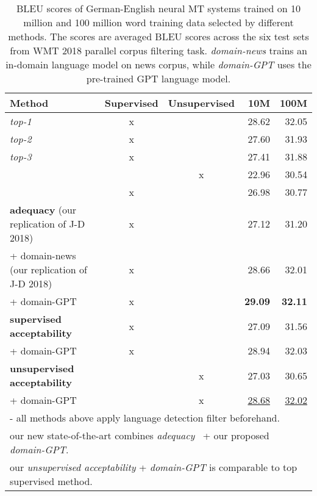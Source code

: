 \documentclass[11pt,a4paper]{article}
\begin{document}
\begin{table*}  \centering
    \begin{tabular}{lccrr}
        \textbf{Method} & \textbf{Supervised} & \textbf{Unsupervised} & \textbf{10M} & \textbf{100M} \\ \hline
        \citet{junczys2018dual} {\small \textit{top-1}} & x & & 28.62 & 32.05 \\
        \citet{lu2018alibaba} {\small \textit{top-2}} & x & & 27.60 & 31.93 \\
        \citet{lo2018accurate} {\small \textit{top-3}} & x & & 27.41 & 31.88 \\
\citet{hangya2018unsupervised} &  & x & 22.96 & 30.54 \\ 
        \citet{chaudhary2019low} & x & & 26.98 & 30.77 \\ \hline
        \textbf{adequacy} (our replication of J-D 2018)& x &   & 27.12 & 31.20 \\
        \hspace{2mm} + domain-news (our replication of J-D 2018) & x &   & 28.66 & 32.01 \\
        \hspace{2mm} + domain-GPT & x &   & \textbf{29.09} & \textbf{32.11} \\ \hline
        \textbf{supervised acceptability} & x &   & 27.09 & 31.56 \\
        \hspace{2mm} + domain-GPT & x &   & 28.94 & 32.03 \\ \hline
        \textbf{unsupervised acceptability} &  & x & 27.03 & 30.65 \\
        \hspace{2mm} + domain-GPT &  & x  & \underline{28.68} &  \underline{32.02} \\ \hline
\multicolumn{5}{p{0.9\textwidth}}{\small - all methods above apply language detection filter beforehand.}\\
        \multicolumn{5}{p{0.9\textwidth}}{\small  our new state-of-the-art combines \textit{adequacy}~\cite{junczys2018dual} + our proposed \textit{domain-GPT}.}\\
        \multicolumn{5}{p{0.9\textwidth}}{\small  our \textit{unsupervised acceptability} + \textit{domain-GPT} is comparable to top supervised method.}\\
    \end{tabular}
    \caption{BLEU scores of German-English neural MT systems trained on 10 million and 100 million word training data selected by different methods. The scores are averaged BLEU scores across the six test sets from WMT 2018 parallel corpus filtering task. {\em domain-news} trains an in-domain language model on news corpus, while {\em domain-GPT} uses the pre-trained GPT language model.}
    \label{tab:bleu_scores}
\end{table*}
\end{document}
